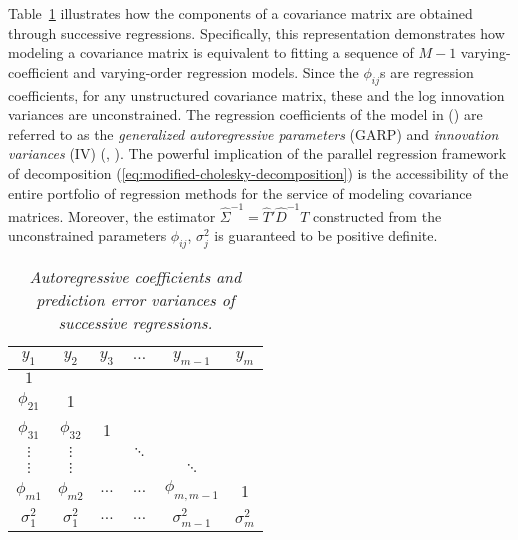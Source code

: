Table~\ref{table:cholesky-decomposition-successive-regressions} illustrates how the components of a covariance matrix are obtained through successive regressions. Specifically, this representation demonstrates how modeling a covariance matrix is equivalent to fitting a sequence of $M - 1$ varying-coefficient and varying-order regression models. Since the $\phi_{ij}$s are regression coefficients, for any unstructured covariance matrix, these and the log innovation variances are unconstrained. The regression coefficients of the model in (\label{eq:mcd-ar-model}) are referred to as the \textit{generalized autoregressive parameters} (GARP) and \textit{innovation variances} (IV) (\cite{pourahmadi1999joint}, \cite{pourahmadi2000maximum}). The powerful implication of the parallel regression framework of decomposition (\ref{eq:modified-cholesky-decomposition}) is the accessibility of the entire portfolio of regression methods for the service of modeling covariance matrices. Moreover, the estimator $\hat{\Sigma}^{-1} = \hat{T}' \hat{D}^{-1} {T}$ constructed from the unconstrained parameters $\phi_{ij}$, $\sigma_j^2$ is guaranteed to be positive definite. 
\bigskip

\begin{table}[H]
\centering
\caption{\textit{Autoregressive coefficients and prediction error variances of successive regressions.}}
\begin{tabular}{cccccc}
 $y_{1}$&$y_{2}$ & $y_{3}$ & $\dots$ &$y_{m-1}$& $y_{m}$\\ \midrule
 $1$& &&&&\\
$\phi_{21}$& 1 &&&& \\
$\phi_{31}$& $\phi_{32}$& 1 &&& \\ 
$\vdots$ & $\vdots$ & & $\ddots$&& \\
$\vdots$ & $\vdots$ & && $\ddots$& \\
$\phi_{m1}$& $\phi_{m2}$&$\dots$ &$\dots$ &$\phi_{m,m-1}$ & 1\\ \midrule
$\sigma_1^2$ & $\sigma_1^2$ & $\dots$&$\dots$ &$\sigma_{m-1}^2$ &$\sigma_m^2$
\end{tabular} \label{table:cholesky-decomposition-successive-regressions}
\end{table}

